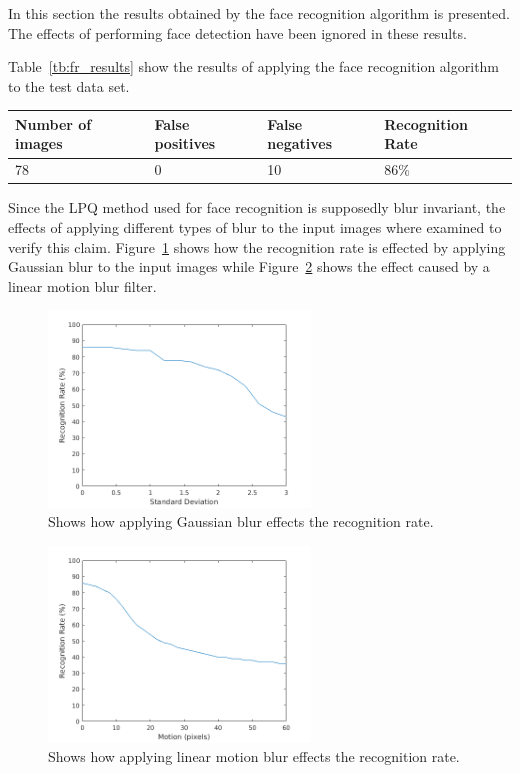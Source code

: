 In this section the results obtained by the face recognition algorithm is  presented. The effects of performing face detection have been ignored in these results.

Table~\ref{tb:fr_results} show the results of applying the face recognition algorithm to the test data set.

\begin{center}
  \label{tb:fr_results}
    \begin{tabular}{ | l | l | l | l |}
    \hline
    Number of images & False positives & False negatives & Recognition Rate \\ \hline
    78 & 0 & 10 & 86\% \\ \hline
    \end{tabular}
\end{center}

Since the LPQ method used for face recognition is supposedly blur invariant, the effects of applying different types of blur to the input images where examined to verify this claim. Figure~\ref{fig:fr_result_plots_gauss} shows how the recognition rate is effected by applying Gaussian blur to the input images while Figure~\ref{fig:fr_result_plots_motion} shows the effect caused by a linear motion blur filter.

\begin{figure}[H]
\centering
\includegraphics[width=0.62\textwidth]{img/blur_test/gauss_plot.png}
\caption{Shows how applying Gaussian blur effects the recognition rate.}
\label{fig:fr_result_plots_gauss}
\end{figure}

\begin{figure}[H]
\centering
\includegraphics[width=0.62\textwidth]{img/blur_test/motion_plot.png}
\caption{Shows how applying linear motion blur effects the recognition rate.}
\label{fig:fr_result_plots_motion}
\end{figure}

